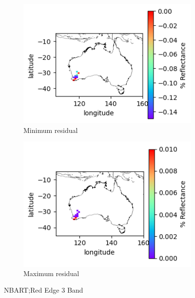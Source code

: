 \documentclass[a4paper]{article}
\begin{document}
      \begin{figure}[h!]
        \centering
          \begin{subfigure}[l]{.4\linewidth}
            \hspace{-32mm}
            \includegraphics[scale=0.9]{plots/nbart/nbart_red_edge_3-MinResidual.png}
            \caption{Minimum residual}
          \end{subfigure}
%
          \begin{subfigure}[r]{.4\linewidth}
            \includegraphics[scale=0.9]{plots/nbart/nbart_red_edge_3-MaxResidual.png}
            \caption{Maximum residual}
          \end{subfigure}
        \caption{NBART;\@ Red Edge 3 Band}\label{figure:13}
      \end{figure}
\end{document}
